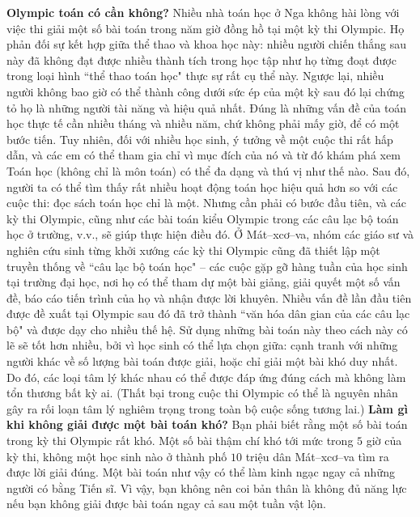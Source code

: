 \begin{multicols}{2}
	\textbf{\color{cackithi}Olympic toán có cần không?}
	\vskip 0.1cm 
	Nhiều nhà toán học ở Nga không hài lòng với việc thi giải một số bài toán trong năm giờ đồng hồ tại một kỳ thi Olympic. Họ phản đối sự kết hợp giữa thể thao và khoa học này: nhiều người chiến thắng sau này đã không đạt được nhiều thành tích trong học tập như họ từng đoạt được trong loại hình ``thể thao toán học" thực sự rất cụ thể này. Ngược lại, nhiều người không bao giờ có thể thành công dưới sức ép của một kỳ sau đó lại chứng tỏ họ là những người tài năng và hiệu quả nhất. Đúng là những vấn đề của toán học thực tế cần nhiều tháng và nhiều năm, chứ không phải mấy giờ, để có một bước tiến.
	\vskip 0.1cm
	Tuy nhiên, đối với nhiều học sinh, ý tưởng về một cuộc thi rất hấp dẫn, và các em có thể tham gia chỉ vì mục đích của nó và từ đó khám phá xem Toán học (không chỉ là môn toán) có thể đa dạng và thú vị như thế nào. Sau đó, người ta có thể tìm thấy rất nhiều hoạt động toán học hiệu quả hơn so với các cuộc thi: đọc sách toán học chỉ là một. Nhưng cần phải có bước đầu tiên, và các kỳ thi Olympic, cũng như các bài toán kiểu Olympic trong các câu lạc bộ toán học ở trường, v.v., sẽ giúp thực hiện điều đó.
	\vskip 0.1cm
	Ở Mát--xcơ--va, nhóm các giáo sư và nghiên cứu sinh từng khởi xướng các kỳ thi Olympic cũng đã thiết lập một truyền thống về ``câu lạc bộ toán học" -- các cuộc gặp gỡ hàng tuần của học sinh tại trường đại học, nơi họ có thể tham dự một bài giảng, giải quyết một số vấn đề, báo cáo tiến trình của họ và nhận được lời khuyên. Nhiều vấn đề lần đầu tiên được đề xuất tại Olympic sau đó đã trở thành ``văn hóa dân gian của các câu lạc bộ" và được dạy cho nhiều thế hệ.
	\vskip 0.1cm
	Sử dụng những bài toán này theo cách này có lẽ sẽ tốt hơn nhiều, bởi vì học sinh có thể lựa chọn giữa: cạnh tranh với những người khác về số lượng bài toán được giải, hoặc chỉ giải một bài khó duy nhất. Do đó, các loại tâm lý khác nhau có thể được đáp ứng đúng cách mà không làm tổn thương bất kỳ ai. (Thất bại trong cuộc thi Olympic có thể là nguyên nhân gây ra rối loạn tâm lý nghiêm trọng trong toàn bộ cuộc sống tương lai.)
	\vskip 0.1cm
	\textbf{\color{cackithi}Làm gì khi không giải được một bài toán khó?}
	\vskip 0.1cm 
	Bạn phải biết rằng một số bài toán trong kỳ thi Olympic rất khó. Một số bài thậm chí khó tới mức trong $5$ giờ của kỳ thi, không một học sinh nào ở thành phố $10$ triệu dân Mát--xcơ--va tìm ra được lời giải đúng. Một bài toán như vậy có thể làm kinh ngạc ngay cả những người có bằng Tiến sĩ. Vì vậy, bạn không nên coi bản thân là không đủ năng lực nếu bạn không giải được bài toán ngay cả sau một tuần vật lộn.

\end{multicols}
